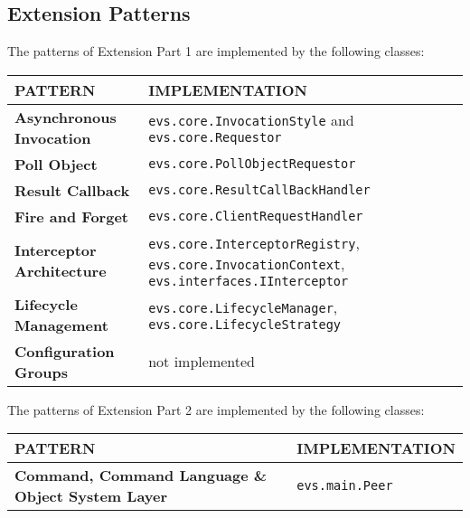 \documentclass[a4paper]{article}
\begin{document}
\vspace{1cm}

\subsection*{Extension Patterns}

The patterns of Extension Part 1 are implemented by the following classes:\\

\begin{small}
\begin{tabular}{| p{4cm} | p{9cm} |}\hline
\textbf{PATTERN} & \textbf{IMPLEMENTATION}\\\hline\hline
\textbf{Asynchronous Invocation} & \texttt{evs.core.InvocationStyle} and \texttt{evs.core.Requestor}\\\hline
\textbf{Poll Object} & \texttt{evs.core.PollObjectRequestor}\\\hline
\textbf{Result Callback} & \texttt{evs.core.ResultCallBackHandler}\\\hline
\textbf{Fire and Forget} & \texttt{evs.core.ClientRequestHandler}\\\hline
\textbf{Interceptor Architecture} & \texttt{evs.core.InterceptorRegistry}, \texttt{evs.core.InvocationContext}, \texttt{evs.interfaces.IInterceptor}\\\hline
\textbf{Lifecycle Management} & \texttt{evs.core.LifecycleManager}, \texttt{evs.core.LifecycleStrategy}\\\hline
\textbf{Configuration Groups} & not implemented \\\hline
\end{tabular}
\end{small}

\vspace{0.5cm}
The patterns of Extension Part 2 are implemented by the following classes:\\

\begin{small}
\begin{tabular}{| p{4cm} | p{9cm} |}\hline
\textbf{PATTERN} & \textbf{IMPLEMENTATION}\\\hline\hline
\textbf{Command, Command Language \& Object System Layer} & \texttt{evs.main.Peer}\\\hline
\end{tabular}
\end{small}
\end{document}
